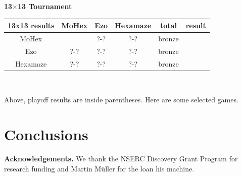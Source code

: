 \documentclass{icga}
\def\Eo{\mbox{\sc Ezo}}
\def\Hz{\mbox{\sc Hexamaze}}
\def\Mx{\mbox{\sc MoHex}}
\begin{document}
\newpage
{\large\bf 13$\times$13 Tournament}


\hfill\begin{tabular}{|c|c|c|c|c|c|}
\hline 13x13 results &\Mx{} &\Eo{}  &\Hz{}   & total & result \\ 
\hline \Mx{} &      &  ?-?    & ?-?  & bronze \\
\hline \Eo{} &  ?-? &  ?-?    & ?-?  & bronze \\
\hline \Hz{} &  ?-? &  ?-?    & ?-?  & bronze \\
\hline
\end{tabular}\hfill~

Above, playoff results are inside parentheses.
Here are some selected games.

\section{Conclusions}


{\bf Acknowledgements.}
We thank the NSERC Discovery Grant Program for research funding and
Martin M\"{u}ller for the loan his machine.

\end{document}
